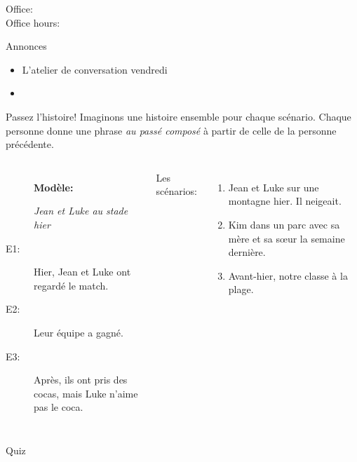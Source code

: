 \documentclass{beamer}
\subtitle[Passé composé (révision)]{Révision du passé composé}
\begin{document}
  \begin{frame}
    \titlepage
    \tiny{Office: \\
          Office hours: }
  \end{frame}

  \begin{frame}{Annonces}
    \begin{itemize}
      \item L'atelier de conversation vendredi
      \item[] 
    \end{itemize}
  \end{frame}

  \begin{frame}{Passez l'histoire!}
    Imaginons une histoire ensemble pour chaque scénario.
    Chaque personne donne une phrase \emph{au passé composé} à partir de celle de la personne précédente.
    \begin{columns}
        \begin{description}
          \item[] \textbf{Modèle:}
          \item[] \emph{Jean et Luke au stade hier}
          \item[E1:] Hier, Jean et Luke ont regardé le match.
          \item[E2:] Leur équipe a gagné.
          \item[E3:] Après, ils ont pris des cocas, mais Luke n'aime pas le coca.
        \end{description}
        Les scénarios:
        \begin{enumerate}
          \item Jean et Luke sur une montagne hier. Il neigeait.
          \item Kim dans un parc avec sa mère et sa sœur la semaine dernière.
          \item Avant-hier, notre classe à la plage.
        \end{enumerate}
    \end{columns}
  \end{frame}

  \begin{frame}{}
    \begin{center}
      \Large Quiz
    \end{center}
  \end{frame}
\end{document}
